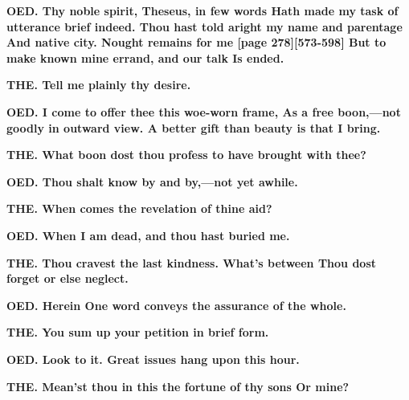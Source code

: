 \documentclass[11pt,letter]{book}
\begin{document}
\par \textbf{OED. Thy noble spirit, Theseus, in few words Hath made my task of utterance brief indeed. Thou hast told aright my name and parentage And native city. Nought remains for me [page 278][573-598] But to make known mine errand, and our talk Is ended.}
\par 

\par \textbf{THE. Tell me plainly thy desire.}
\par 

\par \textbf{OED. I come to offer thee this woe-worn frame, As a free boon,—not goodly in outward view. A better gift than beauty is that I bring.}
\par 

\par \textbf{THE. What boon dost thou profess to have brought with thee?}
\par 

\par \textbf{OED. Thou shalt know by and by,—not yet awhile.}
\par 

\par \textbf{THE. When comes the revelation of thine aid?}
\par 

\par \textbf{OED. When I am dead, and thou hast buried me.}
\par 

\par \textbf{THE. Thou cravest the last kindness. What’s between Thou dost forget or else neglect.}
\par 

\par \textbf{OED. Herein One word conveys the assurance of the whole.}
\par 

\par \textbf{THE. You sum up your petition in brief form.}
\par 

\par \textbf{OED. Look to it. Great issues hang upon this hour.}
\par 

\par \textbf{THE. Mean’st thou in this the fortune of thy sons Or mine?}
\par 
\end{document}
